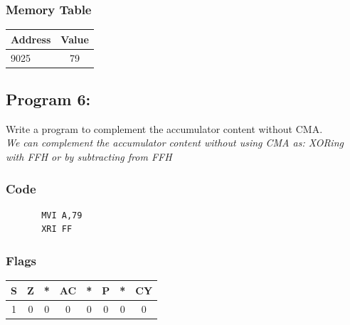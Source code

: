 \documentclass[]{report}
\begin{document}
\subsubsection {Memory Table}
\begin{tabular}{lc}
    \hline
    Address & Value  \\
    \hline

    9025 & 79 \\
    \hline
\end{tabular}



\vspace{10mm}
\subsection*{Program 6: }
Write a program to complement the accumulator content without CMA.\\
\emph{We can complement the accumulator content without using CMA as: XORing with FFH or by subtracting from FFH}
\subsubsection{Code}
\begin{verbatim}
	   MVI A,79
	   XRI FF
\end{verbatim}
\subsubsection{Flags}
\begin{tabular}{cccccccc}
\hline
    S & Z & *  & AC & *  & P & *  & CY  \\
    \hline
    1&0&0&0&0&0&0&0 \\
    \hline
\end{tabular}
\end{document}
